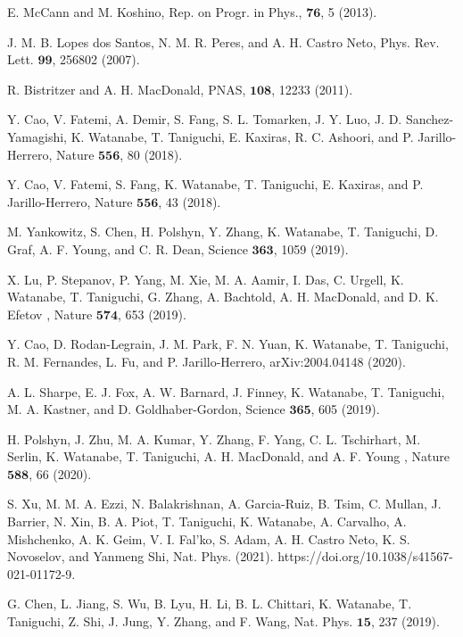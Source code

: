 \documentclass[showpacs,aps,prb,reprint,twocolumn]{revtex4-1}
\begin{document}
\begin{thebibliography}{99}

 E. McCann and M. Koshino, Rep. on Progr. in Phys., $\mathbf{76}$, 5 (2013).

 J. M. B. Lopes dos Santos, N. M. R. Peres, and A. H. Castro Neto, Phys. Rev. Lett. $\mathbf{99}$, 256802 (2007). 

 R. Bistritzer and A. H. MacDonald, PNAS, $\mathbf{108}$, 12233 (2011).

 Y. Cao, V. Fatemi, A. Demir, S. Fang, S. L. Tomarken, J. Y. Luo, J. D. Sanchez-Yamagishi, K. Watanabe, T. Taniguchi, E. Kaxiras, R. C. Ashoori, and P. Jarillo-Herrero, Nature $\mathbf{556}$, 80 (2018).

 Y. Cao, V. Fatemi, S. Fang, K. Watanabe, T. Taniguchi, E. Kaxiras, and P. Jarillo-Herrero, Nature $\mathbf{556}$, 43 (2018).  

 M. Yankowitz, S. Chen, H. Polshyn, Y. Zhang, K. Watanabe, T. Taniguchi, D. Graf, A. F. Young, and C. R. Dean, Science $\mathbf{363}$, 1059 (2019).

 X. Lu, P. Stepanov, P. Yang, M. Xie, M. A. Aamir, I. Das, C. Urgell, K. Watanabe, T. Taniguchi, G. Zhang, A. Bachtold, A. H. MacDonald, and D. K. Efetov , Nature $\mathbf{574}$, 653 (2019).

 Y. Cao, D. Rodan-Legrain, J. M. Park, F. N. Yuan, K. Watanabe, T. Taniguchi, R. M. Fernandes, L. Fu, and P. Jarillo-Herrero, arXiv:2004.04148 (2020). 

 A. L. Sharpe, E. J. Fox, A. W. Barnard, J. Finney, K. Watanabe, T. Taniguchi, M. A. Kastner, and D. Goldhaber-Gordon, Science $\mathbf{365}$, 605 (2019). 

 H. Polshyn, J. Zhu, M. A. Kumar, Y. Zhang, F. Yang, C. L. Tschirhart, M. Serlin, K. Watanabe, T. Taniguchi, A. H. MacDonald, and A. F. Young , Nature $\mathbf{588}$, 66 (2020).

 S. Xu, M. M. A. Ezzi, N. Balakrishnan, A. Garcia-Ruiz, B. Tsim, C. Mullan, J. Barrier, N. Xin, B. A. Piot, T. Taniguchi, K. Watanabe, A. Carvalho, A. Mishchenko, A. K. Geim, V. I. Fal’ko, S. Adam, A. H. Castro Neto, K. S. Novoselov, and Yanmeng Shi, Nat. Phys. (2021). https://doi.org/10.1038/s41567-021-01172-9.

 G. Chen, L. Jiang, S. Wu, B. Lyu, H. Li, B. L. Chittari, K. Watanabe, T. Taniguchi, Z. Shi, J. Jung, Y. Zhang, and F. Wang, Nat. Phys. $\mathbf{15}$, 237 (2019). 


\end{thebibliography}
\end{document}
